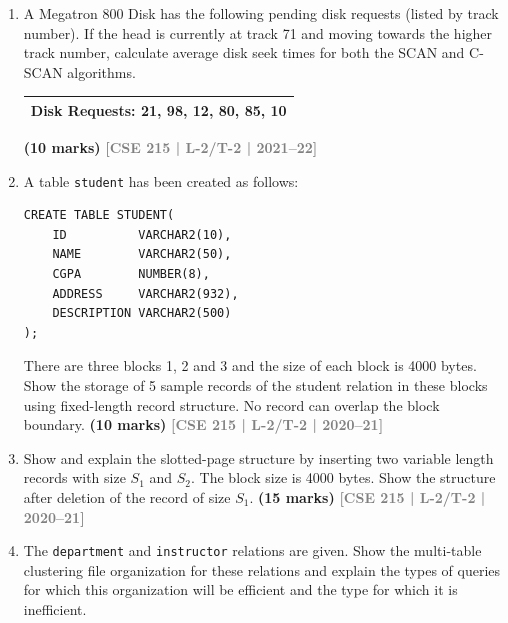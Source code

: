 \documentclass[12pt,a3paper]{article}
\newcommand{\yr}[1]{\hfill\textcolor{gray}{\small\textbf{[#1]}}}
\newcommand{\mk}[1]{\textcolor{orange!70!black}{\small\textbf{(#1 marks)}}}
\begin{document}
\begin{enumerate}
\item A Megatron 800 Disk has the following pending disk requests (listed by track number). If the head is currently at track 71 and moving towards the higher track number, calculate average disk seek times for both the SCAN and C-SCAN algorithms.

\medskip
\begin{center}
\begin{tabular}{l}
\toprule
\textbf{Disk Requests}: 21, 98, 12, 80, 85, 10\\
\bottomrule
\end{tabular}
\end{center}
\mk{10} \yr{CSE 215 | L-2/T-2 | 2021--22}

\item A table \texttt{student} has been created as follows:
\begin{lstlisting}
CREATE TABLE STUDENT(
    ID          VARCHAR2(10),
    NAME        VARCHAR2(50),
    CGPA        NUMBER(8),
    ADDRESS     VARCHAR2(932),
    DESCRIPTION VARCHAR2(500)
);
\end{lstlisting}
There are three blocks 1, 2 and 3 and the size of each block is 4000 bytes. Show the storage of 5 sample records of the student relation in these blocks using fixed-length record structure. No record can overlap the block boundary.
 \mk{10} \yr{CSE 215 | L-2/T-2 | 2020--21}

\item Show and explain the slotted-page structure by inserting two variable length records with size $S_1$ and $S_2$. The block size is 4000 bytes. Show the structure after deletion of the record of size $S_1$.
\mk{15} \yr{CSE 215 | L-2/T-2 | 2020--21}

\item The \texttt{department} and \texttt{instructor} relations are given. Show the multi-table clustering file organization for these relations and explain the types of queries for which this organization will be efficient and the type for which it is inefficient.


\end{enumerate}
\end{document}
